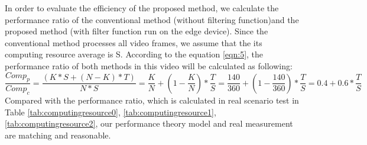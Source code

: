 In order to evaluate the efficiency of the proposed method, we
calculate the performance ratio of the conventional method (without filtering function)and the
proposed method (with filter function run on the edge device). Since the conventional method processes all video frames, we assume that the its computing resource average is S. According to the equation \ref{eqn:5}, the performance ratio of both methods in this video will be calculated as following:\\
\begin{equation}
\label{eqn:10}
\frac{Comp_{p}}{Comp_{c}}=\frac{(K*S+(N-K)*T)}{N*S}=\frac{K}{N} + (1 - \frac{K}{N})*\frac{T}{S}=\frac{140}{360} + (1 - \frac{140}{360})*\frac{T}{S} = 0.4 + 0.6*\frac{T}{S}
\end{equation}
Compared with the performance ratio, which is calculated in real scenario test in Table \ref{tab:computingresource0}, \ref{tab:computingresource1}, \ref{tab:computingresource2}, our performance theory model and real measurement are matching and reasonable.
